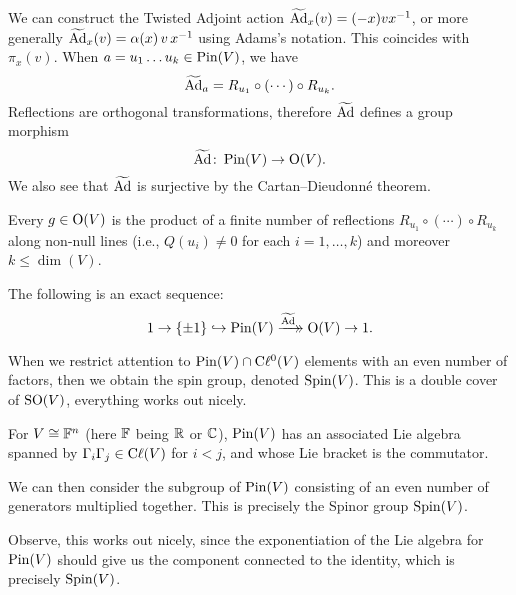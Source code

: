 We can construct the Twisted Adjoint action $\widetilde{\operatorname{Ad}}_{x}(v)=(-x)vx^{-1}$,
or more generally $\widetilde{\operatorname{Ad}}_{x}(v)=\alpha(x)\,v\,x^{-1}$ using
Adams's notation. This coincides with $\pi_{x}(v)$. When $a=u_{1}\dots u_{k}\in\operatorname{Pin}(V)$,
we have
\begin{equation}
\widetilde{\operatorname{Ad}}_{a}=R_{u_{1}}\circ(\cdots)\circ R_{u_{k}}.
\end{equation}
Reflections are orthogonal transformations, therefore $\widetilde{\operatorname{Ad}}$
defines a group morphism
\begin{equation}
\widetilde{\operatorname{Ad}}\colon\operatorname{Pin}(V)\to\mathrm{O}(V).
\end{equation}
We also see that $\widetilde{\operatorname{Ad}}$ is surjective by the Cartan--Dieudonn\'e
theorem.

\begin{theorem}
Every $g\in\mathrm{O}(V)$ is the product of a finite number of reflections
$R_{u_{1}}\circ(\cdots)\circ R_{u_{k}}$ along non-null lines (i.e.,
$Q(u_{i})\neq0$ for each $i=1,\dots,k$) and moreover $k\leq\dim(V)$.
\end{theorem}

\begin{theorem}
  The following is an exact sequence:
  \begin{equation}
1\to\{\pm1\}\hookrightarrow\operatorname{Pin}(V)\xrightarrow[]{\widetilde{\operatorname{Ad}}}\mathrel{\mkern-14mu}\rightarrow\mathrm{O}(V)\to1.
  \end{equation}
\end{theorem}

When we restrict attention to $\operatorname{Pin}(V)\cap\mathrm{C}\ell^{0}(V)$ elements with an
even number of factors, then we obtain the spin group, denoted $\operatorname{Spin}(V)$.
This is a double cover of $\operatorname{SO}(V)$, everything works out nicely.

For $V\cong\mathbb{F}^{n}$ (here $\mathbb{F}$ being $\mathbb{R}$ or $\mathbb{C}$), $\operatorname{Pin}(V)$ has an
associated Lie algebra spanned by $\Gamma_{i}\Gamma_{j}\in\mathrm{C}\ell(V)$ for $i<j$, and
whose Lie bracket is the commutator.

\M We can then consider the subgroup of $\operatorname{Pin}(V)$ consisting of an even
number of generators multiplied together. This is precisely the Spinor
group $\operatorname{Spin}(V)$.

Observe, this works out nicely, since the exponentiation of the Lie
algebra for $\operatorname{Pin}(V)$ should give us the component connected to the
identity, which is precisely $\operatorname{Spin}(V)$.

